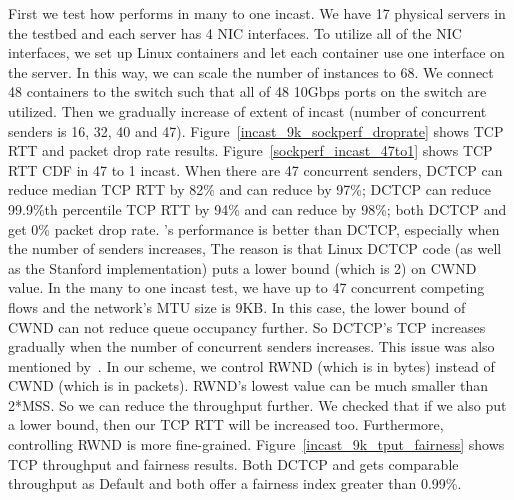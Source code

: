 First we test how \acdc{} performs in many to one incast. 
We have 17 physical servers in the testbed and each server has 4 NIC interfaces. 
To utilize all of the NIC interfaces, 
we set up Linux containers and let each container use one interface on the server. 
In this way, we can scale the number of instances to 68. 
We connect 48 containers to the switch such that all of 48 10Gbps ports on the switch are utilized. 
Then we gradually increase of extent of incast (number of concurrent senders is 16, 32, 40 and 47). 
Figure~\ref{incast_9k_sockperf_droprate} shows TCP RTT and packet drop rate results.
Figure~\ref{sockperf_incast_47to1} shows TCP RTT CDF in 47 to 1 incast. 
When there are 47 concurrent senders, DCTCP can reduce median TCP RTT by 82\% and \acdc{} can reduce by 97\%; 
DCTCP can reduce 99.9\%th percentile TCP RTT by 94\% and \acdc{} can reduce by 98\%; 
both DCTCP and \acdc{} get 0\% packet drop rate. \acdc{}’s performance is better than DCTCP, 
especially when the number of senders increases, The reason is that 
Linux DCTCP code (as well as the Stanford implementation)
puts a lower bound (which is 2) on CWND value. 
In the many to one incast test, we have up to 47 concurrent competing flows and
the network's MTU size is 9KB. In this case,
the lower bound of CWND can not reduce queue occupancy further.
So DCTCP's TCP increases gradually when the number of concurrent senders increases. 
This issue was also mentioned by~\cite{judd2015nsdi}.
In our scheme, we control RWND (which is in bytes) instead of CWND (which is in packets).
RWND's lowest value can be much smaller than 2*MSS.
So we can reduce the throughput further.
We checked that if we also put a lower bound, then our TCP RTT will be increased too.
Furthermore, controlling RWND is more fine-grained.
Figure~\ref{incast_9k_tput_fairness} shows TCP throughput and fairness results.
Both DCTCP and \acdc{} gets comparable throughput as Default and both offer a fairness index greater than 0.99\%.


